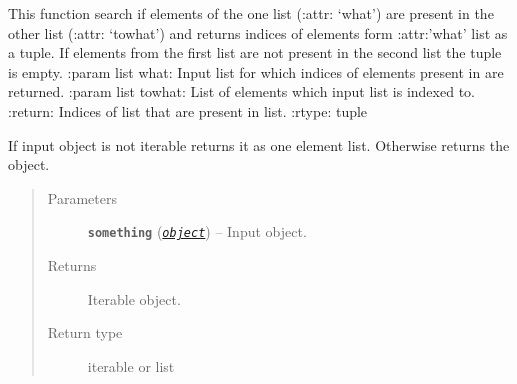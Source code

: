 \documentclass[a4paper,10pt,english]{sphinxmanual}
\begin{document}

\begin{fulllineitems}
\label{aqueduct.utils.helpers:aqueduct.utils.helpers.what2what}
This function search if elements of the one list (:attr: `what') are present in the other list (:attr: `towhat') and returns indices of elements form :attr:'what' list as a tuple.
If elements from the first list are not present in the second list the tuple is empty.
:param list what: Input list for which indices of elements present in  are returned.
:param list towhat: List of elements which input list is indexed to.
:return: Indices of  list that are present in  list.
:rtype: tuple

\end{fulllineitems}


\begin{fulllineitems}
\label{aqueduct.utils.helpers:aqueduct.utils.helpers.make_iterable}
If input object is not iterable returns it as one element list. Otherwise returns the object.
\begin{quote}\begin{description}
\item[{Parameters}] \leavevmode
\textbf{\texttt{something}} (\href{http://docs.python.org/2/library/functions.html\#object}{\emph{\texttt{object}}}) -- Input object.

\item[{Returns}] \leavevmode
Iterable object.

\item[{Return type}] \leavevmode
iterable or list

\end{description}\end{quote}

\end{fulllineitems}


\begin{fulllineitems}
\label{aqueduct.utils.helpers:aqueduct.utils.helpers.strech_zip}
\end{fulllineitems}
\end{document}

